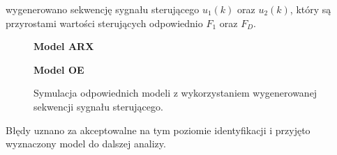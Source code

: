 \noindent wygenerowano sekwencję sygnału sterującego $u_1(k)$ oraz $u_2(k)$, który są przyrostami wartości sterujących odpowiednio $F_1$ oraz $F_D$.

\begin{figure}[h!]
\begin{center}
\Large \textbf{Model ARX}
\end{center} 
\centering
{}
\hfill
{}

\begin{center}
\Large \textbf{Model OE}
\end{center} 
\hfill
{}
\caption{Symulacja odpowiednich modeli z wykorzystaniem wygenerowanej sekwencji sygnału sterującego.}
\end{figure}

Błędy uznano za akceptowalne na tym poziomie identyfikacji i przyjęto wyznaczony model do dalszej analizy.